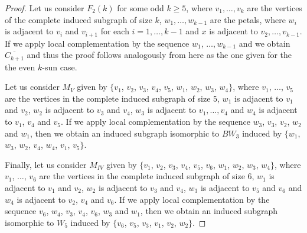 \documentclass[12pt]{book}
\theoremstyle{plain}
\theoremstyle{remark}
\begin{document}
\begin{proof}

Let us consider $F_{2}(k)$ for some odd $k \geq 5$, where $v_1, \ldots, v_{k}$ are the vertices of the complete induced subgraph of size $k$, $w_1, \ldots, w_{k-1}$ are the petals, where $w_i$ is adjacent to $v_i$ and $v_{i+1}$ for each $i=1, \ldots, k-1$ and $x$ is adjacent to $v_2, \ldots, v_{k-1}$.
If we apply local complementation by the sequence $w_1$, $\ldots, w_{k-1}$ and we obtain $\overline{C_{k+1}}$ and thus the proof follows analogously from here as the one given for the the even $k$-sun case.


Let us consider $M_V$ given by $\{ v_1$, $v_2$, $v_3$, $v_4$, $v_5$, $w_{1}$, $w_{2}$, $w_{3}$, $w_4 \}$, where $v_1$, $\ldots$, $v_5$ are the vertices in the complete induced subgraph of size $5$, $w_1$ is adjacent to $v_1$ and $v_2$, $w_2$ is adjacent to $v_3$ and $v_4$, $w_3$ is adjacent to $v_1, \ldots, v_4$ and $w_4$ is adjacent to $v_1$, $v_4$ and $v_5$.
If we apply local complementation by the sequence $w_3$, $v_3$, $v_2$, $w_2$ and $w_1$, then we obtain an induced subgraph isomorphic to $BW_3$ induced by $\{ w_1$, $w_3$, $w_2$, $v_4$, $w_4$, $v_1$, $v_5 \}$.


Finally, let us consider $M_{IV}$ given by $\{ v_1$, $v_2$, $v_3$, $v_4$, $v_5$, $v_6$, $w_{1}$, $w_{2}$, $w_{3}$, $w_4 \}$, where $v_1$, $\ldots$, $v_6$ are the vertices in the complete induced subgraph of size $6$, $w_1$ is adjacent to $v_1$ and $v_2$, $w_2$ is adjacent to $v_3$ and $v_4$, $w_3$ is adjacent to $v_5$ and $v_6$ and $w_4$ is adjacent to $v_2$, $v_4$ and $v_6$.
If we apply local complementation by the sequence $v_6$, $w_4$, $v_3$, $v_4$, $v_6$, $w_3$ and $w_1$, then we obtain an induced subgraph isomorphic to $W_5$ induced by $\{ v_6$, $v_5$, $v_3$, $v_1$, $v_2$, $w_2 \}$.





\end{proof}
\end{document}
